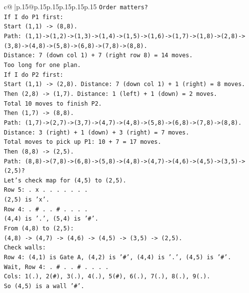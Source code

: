 \documentclass{article}
\begin{document}
{\begin{supertabular}{c@{$\;$}|p{.15\linewidth}@{}p{.15\linewidth}p{.15\linewidth}p{.15\linewidth}p{.15\linewidth}p{.15\linewidth}}
{{{\texttt{Order matters?} \\
\texttt{If I do P1 first:} \\
\texttt{Start (1,1) {-}> (8,8).} \\
\texttt{Path: (1,1){-}>(1,2){-}>(1,3){-}>(1,4){-}>(1,5){-}>(1,6){-}>(1,7){-}>(1,8){-}>(2,8){-}>(3,8){-}>(4,8){-}>(5,8){-}>(6,8){-}>(7,8){-}>(8,8).} \\
\texttt{Distance: 7 (down col 1) + 7 (right row 8) = 14 moves.} \\
\texttt{Too long for one plan.} \\
\texttt{If I do P2 first:} \\
\texttt{Start (1,1) {-}> (2,8). Distance: 7 (down col 1) + 1 (right) = 8 moves.} \\
\texttt{Then (2,8) {-}> (1,7). Distance: 1 (left) + 1 (down) = 2 moves.} \\
\texttt{Total 10 moves to finish P2.} \\
\texttt{Then (1,7) {-}> (8,8).} \\
\texttt{Path: (1,7){-}>(2,7){-}>(3,7){-}>(4,7){-}>(4,8){-}>(5,8){-}>(6,8){-}>(7,8){-}>(8,8).} \\
\texttt{Distance: 3 (right) + 1 (down) + 3 (right) = 7 moves.} \\
\texttt{Total moves to pick up P1: 10 + 7 = 17 moves.} \\
\texttt{Then (8,8) {-}> (2,5).} \\
\texttt{Path: (8,8){-}>(7,8){-}>(6,8){-}>(5,8){-}>(4,8){-}>(4,7){-}>(4,6){-}>(4,5){-}>(3,5){-}>(2,5)?} \\
\texttt{Let's check map for (4,5) to (2,5).} \\
\texttt{Row 5: . x . . . . . . .} \\
\texttt{(2,5) is 'x'.} \\
\texttt{Row 4: . \# . . \# . . . .} \\
\texttt{(4,4) is '.', (5,4) is '\#'.} \\
\texttt{From (4,8) to (2,5):} \\
\texttt{(4,8) {-}> (4,7) {-}> (4,6) {-}> (4,5) {-}> (3,5) {-}> (2,5).} \\
\texttt{Check walls:} \\
\texttt{Row 4: (4,1) is Gate A, (4,2) is '\#', (4,4) is '.', (4,5) is '\#'.} \\
\texttt{Wait, Row 4: . \# . . \# . . . .} \\
\texttt{Cols: 1(.), 2(\#), 3(.), 4(.), 5(\#), 6(.), 7(.), 8(.), 9(.).} \\
\texttt{So (4,5) is a wall '\#'.} \\
}}}
\end{supertabular}}
\end{document}

